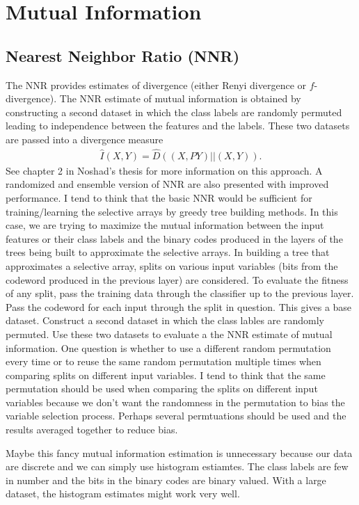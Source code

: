 \documentclass{article}
\begin{document}
\section{Mutual Information}

\subsection{Nearest Neighbor Ratio (NNR)}

The NNR provides estimates of divergence (either Renyi divergence or $f$-divergence).  The NNR estimate of mutual information is obtained by constructing a second dataset in which the class labels are randomly permuted leading to independence between the features and the labels.  These two datasets are passed into a divergence measure
\begin{gather*}
\hat{I}(X,Y) = \hat{D}((X,PY) || (X,Y)).
\end{gather*}
See chapter 2 in Noshad's thesis for more information on this approach.  A randomized and ensemble version of NNR are also presented with improved performance.  I tend to think that the basic NNR would be sufficient for training/learning the selective arrays by greedy tree building methods.  In this case, we are trying to maximize the mutual information between the input features or their class labels and the binary codes produced in the layers of the trees being built to approximate the selective arrays.  In building a tree that approximates a selective array, splits on various input variables (bits from the codeword produced in the previous layer) are considered.  To evaluate the fitness of any split, pass the training data through the classifier up to the previous layer.  Pass the codeword for each input through the split in question.  This gives a base dataset.  Construct a second dataset in which the class lables are randomly permuted.  Use these two datasets to evaluate a the NNR estimate of mutual information.  One question is whether to use a different random permutation every time or to reuse the same random permutation multiple times when comparing splits on different input variables.  I tend to think that the same permutation should be used when comparing the splits on different input variables because we don't want the randomness in the permutation to bias the variable selection process.  Perhaps several permtuations should be used and the results averaged together to reduce bias.

Maybe this fancy mutual information estimation is unnecessary because our data are discrete and we can simply use histogram estiamtes.  The class labels are few in number and the bits in the binary codes are binary valued.  With a large dataset, the histogram estimates might work very well.
\end{document}
